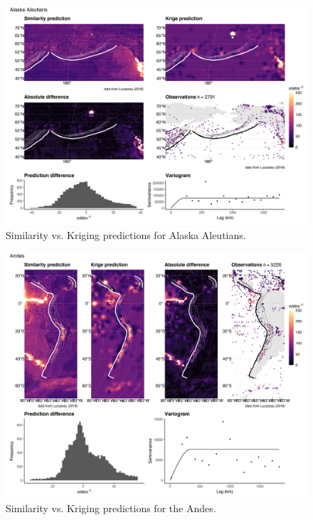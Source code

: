 \documentclass[draft,linenumbers]{agujournal2018}
\begin{document}
\begin{figure}[h]

{\centering \includegraphics[width=0.95\linewidth,]{../figs/diff/comp/Alaska_Aleutians} 

}

\caption{Similarity vs. Kriging predictions for Alaska Aleutians.}\label{fig:alaska.comp}
\end{figure}

\begin{figure}[h]

{\centering \includegraphics[width=0.95\linewidth,]{../figs/diff/comp/Andes} 

}

\caption{Similarity vs. Kriging predictions for the Andes.}\label{fig:andes.comp}
\end{figure}
\end{document}
